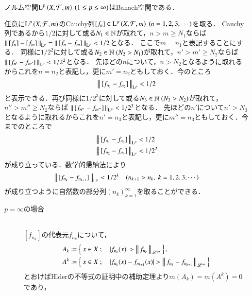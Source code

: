 \begin{itembox}[l]{}
	\begin{prp}
		ノルム空間$\operatorname{L}^{p} \left(X,\mathcal{F},m\right)\ (1 \leq p \leq \infty)$はBanach空間である．
	\end{prp}
\end{itembox}
\begin{prf}
	任意に$\operatorname{L}^{p} \left(X,\mathcal{F},m\right)$のCauchy列$[f_n] \in \Lp{p}{X,\mathcal{F},m}\ (n=1,2,3,\cdots)$を取る．
	Cauchy列であるから$1/2$に対して或る$N_1 \in \mathbb{N}$が取れて，$n>m \geq N_1$ならば
	$\left\|\, [f_n]-[f_m]\, \right\|_{\mathrm{L}^p} = \left\|\, [f_n - f_m]\, \right\|_{\mathrm{L}^p} < 1/2$となる．
	ここで$m = n_1$と表記することにする．
	同様に$1/2^2$に対して或る$N_2 \in \mathbb{N}\ (N_2 > N_1)$が取れて，$n'>m' \geq N_2$ならば
	$\left\|\, [f_{n'} - f_{m'}]\, \right\|_{\mathrm{L}^p} < 1/2^2$となる．
	先ほどの$n$について，$n > N_2$となるように取れるからこれを$n = n_2$と表記し，更に$m' = n_2$ともしておく．今のところ
	\begin{align}
		\left\|\, [f_{n_1} - f_{n_2}]\, \right\|_{\mathrm{L}^p} < 1/2
	\end{align}
	と表示できる．再び同様に$1/2^3$に対して或る$N_3 \in \mathbb{N}\ (N_3 > N_2)$が取れて，$n''>m'' \geq N_2$ならば
	$\left\|\, [f_{n''} - f_{m''}]\, \right\|_{\mathrm{L}^p} < 1/2^3$となる．
	先ほどの$n'$について$n' > N_3$となるように取れるからこれを$n' = n_3$と表記し，更に$m'' = n_3$ともしておく．今までのところで
	\begin{align}
		&\left\|\, [f_{n_1} - f_{n_2}]\, \right\|_{\mathrm{L}^p} < 1/2 \\
		&\left\|\, [f_{n_2} - f_{n_3}]\, \right\|_{\mathrm{L}^p} < 1/2^2
	\end{align}
	が成り立っている．数学的帰納法により
	\begin{align}
		\left\|\, [f_{n_k} - f_{n_{k+1}}]\, \right\|_{\mathrm{L}^p} < 1/2^k \quad (n_{k+1} > n_k,\ k=1,2,3,\cdots) \label{ineq:Lp_banach_2}
	\end{align}
	が成り立つように自然数の部分列$(n_k)_{k=1}^{\infty}$を取ることができる．
	\begin{description}
		\item[$p = \infty$の場合]\mbox{}\\
			$[f_{n_k}]$の代表元$f_{n_k}$について，
			\begin{align}
				A_k &\coloneqq \left\{\ x \in X\ ;\quad |f_{n_k}(x)| > \left\|\, f_{n_k}\, \right\|_{\mathscr{L}^\infty}\ \right\}, \\
				A^k &\coloneqq \left\{\ x \in X\ ;\quad |f_{n_k}(x) - f_{n_{k+1}}(x)| > \left\|\, f_{n_k} - f_{n_{k+1}}\, \right\|_{\mathscr{L}^\infty}\ \right\}
			\end{align}
			とおけばHlderの不等式の証明中の補助定理より$m(A_k) = m(A^k) = 0$であり，

\end{description}
\end{prf}
